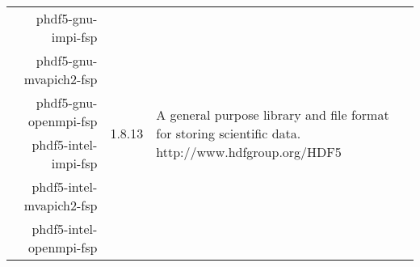\begin{tabularx}{\textwidth}{r|c|X}
phdf5-gnu-impi-fsp & 
\multirow{6}{*}{1.8.13} & 
\multirow{6}{\linewidth}{A general purpose library and file format for storing scientific data. \newline {\color{blue} http://www.hdfgroup.org/HDF5}} \\ 
phdf5-gnu-mvapich2-fsp & 
& \\ 
phdf5-gnu-openmpi-fsp & 
& \\ 
phdf5-intel-impi-fsp & 
& \\ 
phdf5-intel-mvapich2-fsp & 
& \\ 
phdf5-intel-openmpi-fsp & 
& \\ 
\hline

\bottomrule
\end{tabularx}
